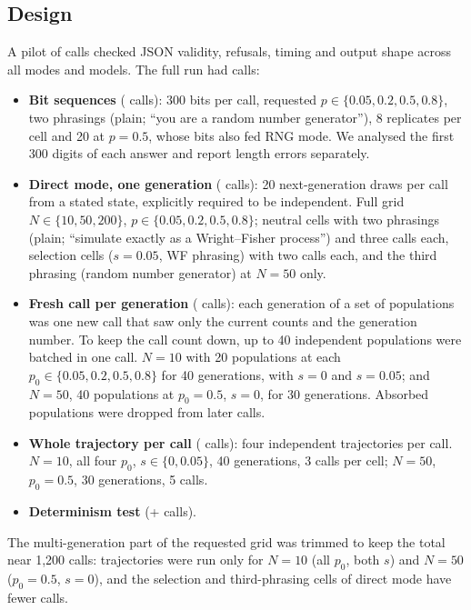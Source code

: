 \documentclass[11pt,a4paper]{article}
\begin{document}
\subsection{Design}
A pilot of \nPilot{} calls checked JSON validity, refusals, timing and output shape across all modes and models.
The full run had \nFull{} calls:
\begin{itemize}
\item \textbf{Bit sequences} (\nFullBits{} calls): 300 bits per call, requested $p\in\{0.05,0.2,0.5,0.8\}$, two phrasings (plain; ``you are a random number generator''), 8 replicates per cell and 20 at $p=0.5$, whose bits also fed RNG mode. We analysed the first 300 digits of each answer and report length errors separately.
\item \textbf{Direct mode, one generation} (\nFullDirect{} calls): 20 next-generation draws per call from a stated state, explicitly required to be independent. Full grid $N\in\{10,50,200\}$, $p\in\{0.05,0.2,0.5,0.8\}$; neutral cells with two phrasings (plain; ``simulate exactly as a Wright--Fisher process'') and three calls each, selection cells ($s=0.05$, WF phrasing) with two calls each, and the third phrasing (random number generator) at $N=50$ only.
\item \textbf{Fresh call per generation} (\nFullMl{} calls): each generation of a set of populations was one new call that saw only the current counts and the generation number. To keep the call count down, up to 40 independent populations were batched in one call. $N=10$ with 20 populations at each $p_0\in\{0.05,0.2,0.5,0.8\}$ for 40 generations, with $s=0$ and $s=0.05$; and $N=50$, 40 populations at $p_0=0.5$, $s=0$, for 30 generations. Absorbed populations were dropped from later calls.
\item \textbf{Whole trajectory per call} (\nFullTraj{} calls): four independent trajectories per call. $N=10$, all four $p_0$, $s\in\{0,0.05\}$, 40 generations, 3 calls per cell; $N=50$, $p_0=0.5$, 30 generations, 5 calls.
\item \textbf{Determinism test} (\nFullBitsdup{}+\nFullDirectdup{} calls).
\end{itemize}
The multi-generation part of the requested grid was trimmed to keep the total near 1,200 calls: trajectories were run only for $N=10$ (all $p_0$, both $s$) and $N=50$ ($p_0=0.5$, $s=0$), and the selection and third-phrasing cells of direct mode have fewer calls.
\end{document}
